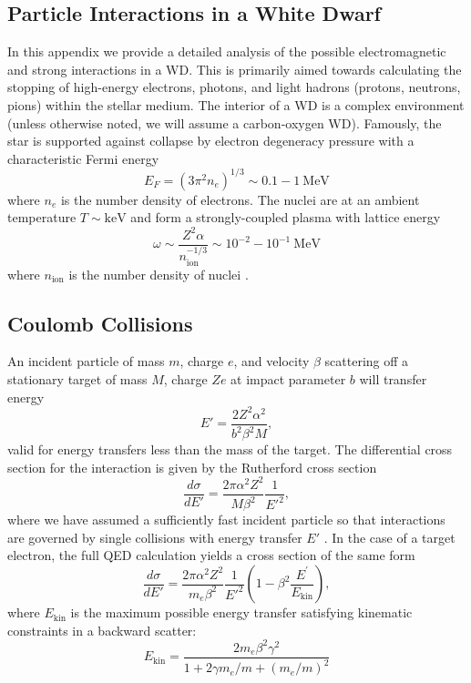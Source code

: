 \documentclass[twocolumn,showpacs,preprintnumbers,amsmath,amssymb,prd]{revtex4}
\def\r{\right)}
\def\l{\left(}
\begin{document}
\begin{appendices}

\section{Particle Interactions in a White Dwarf}
\label{sec:appendix}
In this appendix we provide a detailed analysis of the possible electromagnetic and strong interactions in a WD.
This is primarily aimed towards calculating the stopping of high-energy electrons, photons, and light hadrons (protons, neutrons, pions) within the stellar medium.
The interior of a WD is a complex environment (unless otherwise noted, we will assume a carbon-oxygen WD).
Famously, the star is supported against collapse by electron degeneracy pressure with a characteristic Fermi energy
\begin{equation}
E_F = (3 \pi^2 n_e)^{1/3} \sim 0.1 - 1 ~\text{MeV}
\end{equation}
where $n_e$ is the number density of electrons.
The nuclei are at an ambient temperature $T \sim \text{keV}$ and form a strongly-coupled plasma with lattice energy
\begin{equation}
\label{eq:lattice}
\omega \sim \frac{Z^2 \alpha}{n_\text{ion}^{-1/3}} \sim 10^{-2} - 10^{-1} ~\text{MeV}
\end{equation}
where $n_\text{ion}$ is the number density of nuclei \cite{Teukolsky}.

\subsection*{Coulomb Collisions}

An incident particle of mass $m$, charge $e$, and velocity $\beta$ scattering off a stationary target of mass $M$, charge $Ze$ at impact parameter $b$ will transfer energy
\begin{equation}
\label{eq:impact}
E' = \frac{2 Z^2 \alpha^2}{b^2 \beta ^2 M},
\end{equation}
valid for energy transfers less than the mass of the target. 
The differential cross section for the interaction is given by the Rutherford cross section
\begin{equation}
\label{eq:rutherford}
\frac{d \sigma}{dE'} = \frac{2 \pi  \alpha^2 Z^2}{M \beta^2} \frac{1}{E'^2},
\end{equation}
where we have assumed a sufficiently fast incident particle so that interactions are governed by single collisions with energy transfer $E'$ \cite{Agashe:2014kda}.
In the case of a target electron, the full QED calculation yields a cross section of the same form
\begin{equation}
\frac{d \sigma}{dE'} = \frac{2 \pi  \alpha^2 Z^2}{m_e \beta^2} \frac{1}{E'^2} \l1-\beta^2 \frac{E^\prime}{E_\text{kin}} \r,
\end{equation}
where $E_\text{kin}$ is the maximum possible energy transfer satisfying kinematic constraints in a backward scatter:
\begin{equation}
\label{eq:Ekin}
E_{\text{kin}} = \frac{2 m_e \beta^2 \gamma^2}{1+ 2\gamma m_e/m +(m_e/m)^2}
\end{equation}


\end{appendices}
\end{document}
